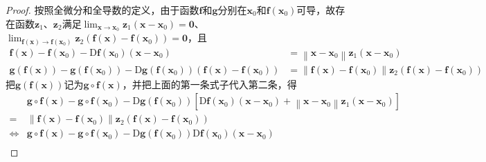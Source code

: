 \documentclass[../main.tex]{subfiles}
\begin{document}
\begin{proof}
    按照全微分和全导数的定义，由于函数$\mathbf{f}$和$\mathbf{g}$分别在$\mathbf{x}_0$和$\mathbf{f}\left(\mathbf{x}_0\right)$可导，故存在函数$\mathbf{z}_1$、$\mathbf{z}_2$满足$\lim_{\mathbf{x}\to\mathbf{x}_0}\mathbf{z}_1\left(\mathbf{x}-\mathbf{x}_0\right)=\mathbf{0}$、$\lim_{\mathbf{f}\left(\mathbf{x}\right)\to\mathbf{f}\left(\mathbf{x}_0\right)}\mathbf{z}_2\left(\mathbf{f}\left(\mathbf{x}\right)-\mathbf{f}\left(\mathbf{x}_0\right)\right)=\mathbf{0}$，且
    \begin{align*}
        \mathbf{f}\left(\mathbf{x}\right)-\mathbf{f}\left(\mathbf{x}_0\right)-\mathrm{D}\mathbf{f}\left(\mathbf{x}_0\right)\left(\mathbf{x}-\mathbf{x}_0\right)                                                                                                                    & =\left\|\mathbf{x}-\mathbf{x}_0\right\|\mathbf{z}_1\left(\mathbf{x}-\mathbf{x}_0\right)                                                                                             \\
        \mathbf{g}\left(\mathbf{f}\left(\mathbf{x}\right)\right)-\mathbf{g}\left(\mathbf{f}\left(\mathbf{x}_0\right)\right)-\mathrm{D}\mathbf{g}\left(\mathbf{f}\left(\mathbf{x}_0\right)\right)\left(\mathbf{f}\left(\mathbf{x}\right)-\mathbf{f}\left(\mathbf{x}_0\right)\right) & =\left\|\mathbf{f}\left(\mathbf{x}\right)-\mathbf{f}\left(\mathbf{x}_0\right)\right\|\mathbf{z}_2\left(\mathbf{f}\left(\mathbf{x}\right)-\mathbf{f}\left(\mathbf{x}_0\right)\right)
    \end{align*}
    把$\mathbf{g}\left(\mathbf{f}\left(\mathbf{x}\right)\right)$记为$\mathbf{g}\circ\mathbf{f}\left(\mathbf{x}\right)$，并把上面的第一条式子代入第二条，得
    \begin{align*}
                        & \mathbf{g}\circ\mathbf{f}\left(\mathbf{x}\right)-\mathbf{g}\circ\mathbf{f}\left(\mathbf{x}_0\right)-\mathrm{D}\mathbf{g}\left(\mathbf{f}\left(\mathbf{x}_0\right)\right)\left[\mathrm{D}\mathbf{f}\left(\mathbf{x}_0\right)\left(\mathbf{x}-\mathbf{x}_0\right)+\left\|\mathbf{x}-\mathbf{x}_0\right\|\mathbf{z}_1\left(\mathbf{x}-\mathbf{x}_0\right)\right] \\
        =               & \left\|\mathbf{f}\left(\mathbf{x}\right)-\mathbf{f}\left(\mathbf{x}_0\right)\right\|\mathbf{z}_2\left(\mathbf{f}\left(\mathbf{x}\right)-\mathbf{f}\left(\mathbf{x}_0\right)\right)                                                                                                                                                                            \\
        \Leftrightarrow & \mathbf{g}\circ\mathbf{f}\left(\mathbf{x}\right)-\mathbf{g}\circ\mathbf{f}\left(\mathbf{x}_0\right)-\mathrm{D}\mathbf{g}\left(\mathbf{f}\left(\mathbf{x}_0\right)\right)\mathrm{D}\mathbf{f}\left(\mathbf{x}_0\right)\left(\mathbf{x}-\mathbf{x}_0\right)                                                                                                     \\

\end{align*}
\end{proof}
\end{document}
